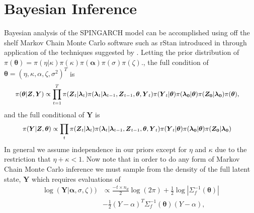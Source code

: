 \documentclass[11pt]{isuthesis}
\begin{document}
\section{Bayesian Inference}\label{Sec:Bayes}
Bayesian analysis of the SPINGARCH model can be accomplished using off the shelf Markov Chain Monte Carlo software such as rStan introduced in \cite{carpenter2016stan} through application of the techniques suggested by \cite{joseph}.  
Letting the prior distribution of $\pi(\boldsymbol{\theta})=\pi(\eta|\kappa)\pi(\kappa)\pi(\boldsymbol{\alpha})\pi(\sigma)\pi(\zeta)$., the full condition of $\boldsymbol{\boldsymbol{\theta}}=\left(\eta,\kappa,\alpha,\zeta,\sigma^2\right)^T$ is
\begin{align}
&\small\pi(\boldsymbol{\theta} | \boldsymbol{Z},\boldsymbol{Y})\propto  \prod_{t=1}^T\pi(\boldsymbol{Z}_t|\boldsymbol{\lambda}_t)\pi(\boldsymbol{\lambda}_t|\boldsymbol{\lambda}_{t-1},\boldsymbol{Z}_{t-1},\boldsymbol{\theta} ,\boldsymbol{Y}_t)\pi(\boldsymbol{Y}_t|\boldsymbol{\theta} )
\pi(\boldsymbol{\lambda_0}|\boldsymbol{\theta})\pi(\boldsymbol{Z_0}|\boldsymbol{\lambda_0})\pi(\boldsymbol{\theta})\label{eq:FullCondTheta},
\end{align}
and the full conditional of $\boldsymbol{Y}$ is
\begin{align}
&\small\pi(\boldsymbol{Y} | \boldsymbol{Z},\boldsymbol{\theta})\propto \prod_t\pi(\boldsymbol{Z}_t|\boldsymbol{\lambda}_t)\pi(\boldsymbol{\lambda}_t|\boldsymbol{\lambda}_{t-1},\boldsymbol{Z}_{t-1},\boldsymbol{\theta} ,\boldsymbol{Y}_t)\pi(\boldsymbol{Y}_t|\boldsymbol{\theta} )\pi(\boldsymbol{\lambda_0}|\boldsymbol{\theta})\pi(\boldsymbol{Z_0}|\boldsymbol{\lambda_0})
\end{align}
In general we assume independence in our priors except for $\eta$ and $\kappa$ due to the restriction that $\eta+\kappa <1$. Now note that in order to do any form of Markov Chain Monte Carlo inference we must sample from the density of the full latent state, $\boldsymbol{Y}$ which requires evaluations of 
\begin{align}
\log(\boldsymbol{Y}|\boldsymbol{\alpha},\sigma,\zeta)) & \propto \frac{-t \times n_d}{2}\log(2 \pi) + \frac{1}{2} \log | \Sigma_f^{-1}(\boldsymbol{\theta})|\nonumber\\
& - \frac{1}{2}(Y-\alpha)^T\Sigma_f^{-1}(\boldsymbol{\theta})(Y-\alpha) \label{eq:log Y1},
\end{align}
\end{document}
